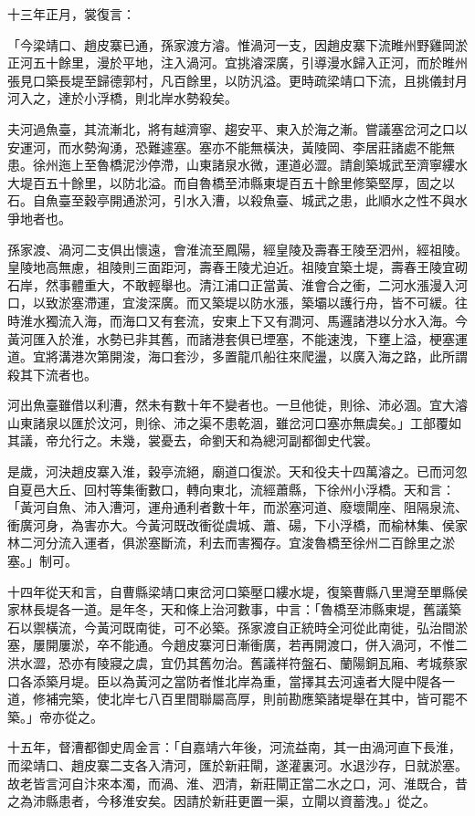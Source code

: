 十三年正月，裳復言：

「今梁靖口、趙皮寨已通，孫家渡方濬。惟渦河一支，因趙皮寨下流睢州野雞岡淤正河五十餘里，漫於平地，注入渦河。宜挑濬深廣，引導漫水歸入正河，而於睢州張見口築長堤至歸德郭村，凡百餘里，以防汎溢。更時疏梁靖口下流，且挑儀封月河入之，達於小浮橋，則北岸水勢殺矣。

夫河過魚臺，其流漸北，將有越濟寧、趨安平、東入於海之漸。嘗議塞岔河之口以安運河，而水勢洶湧，恐難遽塞。塞亦不能無橫決，黃陵岡、李居莊諸處不能無患。徐州迤上至魯橋泥沙停滯，山東諸泉水微，運道必澀。請創築城武至濟寧縷水大堤百五十餘里，以防北溢。而自魯橋至沛縣東堤百五十餘里修築堅厚，固之以石。自魚臺至穀亭開通淤河，引水入漕，以殺魚臺、城武之患，此順水之性不與水爭地者也。

孫家渡、渦河二支俱出懷遠，會淮流至鳳陽，經皇陵及壽春王陵至泗州，經祖陵。皇陵地高無慮，祖陵則三面距河，壽春王陵尤迫近。祖陵宜築土堤，壽春王陵宜砌石岸，然事體重大，不敢輕舉也。清江浦口正當黃、淮會合之衝，二河水漲漫入河口，以致淤塞滯運，宜浚深廣。而又築堤以防水漲，築壩以護行舟，皆不可緩。往時淮水獨流入海，而海口又有套流，安東上下又有澗河、馬邏諸港以分水入海。今黃河匯入於淮，水勢已非其舊，而諸港套俱已堙塞，不能速洩，下壅上溢，梗塞運道。宜將溝港次第開浚，海口套沙，多置龍爪船往來爬盪，以廣入海之路，此所謂殺其下流者也。

河出魚臺雖借以利漕，然未有數十年不變者也。一旦他徙，則徐、沛必涸。宜大濬山東諸泉以匯於汶河，則徐、沛之渠不患乾涸，雖岔河口塞亦無虞矣。」工部覆如其議，帝允行之。未幾，裳憂去，命劉天和為總河副都御史代裳。

是歲，河決趙皮寨入淮，穀亭流絕，廟道口復淤。天和役夫十四萬濬之。已而河忽自夏邑大丘、回村等集衝數口，轉向東北，流經蕭縣，下徐州小浮橋。天和言：「黃河自魚、沛入漕河，運舟通利者數十年，而淤塞河道、廢壞閘座、阻隔泉流、衝廣河身，為害亦大。今黃河既改衝從虞城、蕭、碭，下小浮橋，而榆林集、侯家林二河分流入運者，俱淤塞斷流，利去而害獨存。宜浚魯橋至徐州二百餘里之淤塞。」制可。

十四年從天和言，自曹縣梁靖口東岔河口築壓口縷水堤，復築曹縣八里灣至單縣侯家林長堤各一道。是年冬，天和條上治河數事，中言：「魯橋至沛縣東堤，舊議築石以禦橫流，今黃河既南徙，可不必築。孫家渡自正統時全河從此南徙，弘治間淤塞，屢開屢淤，卒不能通。今趙皮寨河日漸衝廣，若再開渡口，併入渦河，不惟二洪水澀，恐亦有陵寢之虞，宜仍其舊勿治。舊議祥符盤石、蘭陽銅瓦廂、考城蔡家口各添築月堤。臣以為黃河之當防者惟北岸為重，當擇其去河遠者大隄中隄各一道，修補完築，使北岸七八百里間聯屬高厚，則前勘應築諸堤舉在其中，皆可罷不築。」帝亦從之。

十五年，督漕都御史周金言：「自嘉靖六年後，河流益南，其一由渦河直下長淮，而梁靖口、趙皮寨二支各入清河，匯於新莊閘，遂灌裏河。水退沙存，日就淤塞。故老皆言河自汴來本濁，而渦、淮、泗清，新莊閘正當二水之口，河、淮既合，昔之為沛縣患者，今移淮安矣。因請於新莊更置一渠，立閘以資蓄洩。」從之。

